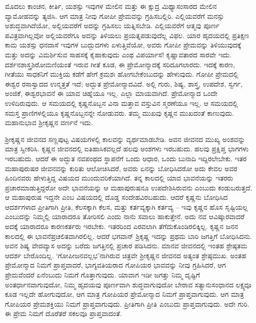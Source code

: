 ಮೊದಲು ಕಾಂಚನ, ಕೀರ್ತಿ, ಯಶಸ್ಸು ಇವುಗಳ ಮೇಲಿನ ಮತ್ತು ಈ ಕ್ಷುದ್ರ ಮಿಥ್ಯಾಸಂಸಾರದ ಮೇಲಿನ ವ್ಯಾಮೋಹವನ್ನು ತ್ಯಜಿಸಿ. ಆಗ ಮಾತ್ರ ನೀವು ಗೋಪೀ ಪ್ರೇಮವನ್ನು ಗ್ರಹಿಸಬಲ್ಲಿರಿ. ಎಲ್ಲಿಯವರೆಗೆ ಮನಸ್ಸು ಅಶುದ್ಧವಾಗಿದೆಯೋ, ಅಲ್ಲಿಯವರೆಗೆ ಅದನ್ನು ಗ್ರಹಿಸಲು ಯತ್ನಿಸಬೇಡಿ. ಎಲ್ಲಿಯವರೆಗೆ ಆತ್ಮವು ಪೂರ್ಣ ಪವಿತ್ರವಾಗಿಲ್ಲವೋ ಅಲ್ಲಿಯವರೆಗೂ ಅದನ್ನು ತಿಳಿಯಲು ಪ್ರಯತ್ನಪಡುವುದೆಲ್ಲ ವಿಫಲ. ಯಾರ ಹೃದಯದಲ್ಲಿ ಪ್ರತಿಕ್ಷಣ ಕಾಮ ಯಶಸ್ಸು ಧನದಾಸೆ ಇವುಗಳ ಬುದ್ಬುದಗಳು ಏಳುತ್ತಿವೆಯೋ, ಅವರು ಗೋಪೀ ಪ್ರೇಮವನ್ನು ತಿಳಿಯುವುದಕ್ಕೆ ಮತ್ತು ಅದನ್ನು ವಿಮರ್ಶಿಸುವ ಸಾಹಸಕ್ಕೆ ಕೈಹಾಕುವುದು ಎಂಥ ವಿಪರ್ಯಾಸ! ಕೃಷ್ಣಾವತಾರದ ಸಾರವೇ ಇದು. ದರ್ಶನಶಾಸ್ತ್ರಶಿರೋಮಣಿಯಂತೆ ಇರುವ ಗೀತೆ ಕೂಡ, ಈ ಪ್ರೇಮೋನ್ಮಾದಕ್ಕೆ ಸರಿದೂಗಲಾರದು. ಇದಕ್ಕೆ ಕಾರಣ, ಗೀತೆಯು ಸಾಧಕನಿಗೆ ಮುಕ್ತಿಯ ಕಡೆಗೆ ಹೇಗೆ ಕ್ರಮಶಃ ಹೋಗಬೇಕೆಂಬುದನ್ನು ಹೇಳುವುದು. ಗೋಪೀ ಪ್ರೇಮದಲ್ಲಿ ಈಶ್ವರ ರಸಾಸ್ವಾದದ ಉನ್ಮತ್ತತೆ ಇದೆ; ಅದ್ಭುತ ಪ್ರೇಮೋನ್ಮಾದವಿದೆ. ಅಲ್ಲಿ ಗುರು, ಶಿಷ್ಯ, ಶಾಸ್ತ್ರ, ಉಪದೇಶ, ಸ್ವರ್ಗ, ಅಂಜಿಕೆ, ಈಶ್ವರಭಾವನೆ ಈ ಯಾವ ಚಿಹ್ನೆಯೂ ಇಲ್ಲ. ಎಲ್ಲಾ ಮಾಯವಾಗಿದೆ. ಪ್ರೇಮೋನ್ಮಾದ ಒಂದೇ ಉಳಿದಿರುವುದು. ಆ ಸಮಯದಲ್ಲಿ ಕೃಷ್ಣನೊಬ್ಬನ ವಿನಾ ಮತ್ತಾವ ವಸ್ತುವಿನ ಸ್ಮರಣೆಯೂ ಇಲ್ಲ. ಆ ಸಮಯದಲ್ಲಿ ಸಮಸ್ತ ಪ್ರಾಣಿಗಳಲ್ಲಿಯೂ ಕೃಷ್ಣನೊಬ್ಬನನ್ನೇ ನೋಡುವರು. ತಮ್ಮ ಮುಖವು ಕೃಷ್ಣನ ಮುಖದಂತೆ ಕಾಣುವುದು. ಮಹಾನುಭಾವ ಶ‍್ರೀಕೃಷ್ಣನ ವರ್ಣನೆ ಇದು. 

ಶ‍್ರೀಕೃಷ್ಣನ ಜೀವನದ ಸಣ್ಣಪುಟ್ಟ ವಿಷಯಗಳಲ್ಲಿ ಕಾಲವನ್ನು ವ್ಯರ್ಥಮಾಡಬೇಡಿ. ಅವನ ಜೀವನದ ಮುಖ್ಯ ಅಂಶವನ್ನು ಮಾತ್ರ ಸ್ವೀಕರಿಸಿ. ಕೃಷ್ಣನ ಜೀವನದಲ್ಲಿ ಐತಿಹಾಸಿಕವಲ್ಲದೆ ಹಲವು ಅಂಶಗಳು ಇರಬಹುದು. ಹಲವು ಪ್ರಕ್ಷಿಪ್ತ ಭಾಗಗಳು ಇರಬಹುದು. ಆದರೆ ಈ ಅದ್ಭುತ ನವಪಂಥದ ಸ್ಥಾಪನೆಗೆ ಒಂದು ಆಧಾರ, ಒಂದು ಬುನಾದಿ ಇದ್ದಿರಲೇಬೇಕು. ಇತರ ಮಹಾಪುರುಷರ ಜೀವನವನ್ನು ಕುರಿತು ಆಲೋಚಿಸಿದರೆ, ಅವರು ಏನನ್ನು ಬೋಧಿಸಿದರೋ ಅದು ಕೇವಲ ಅವರ ಹಿಂದಿನವರು ಹೇಳುತ್ತಿದ್ದ ವಿಷಯದ ಮುಂದುವರಿಕೆಯಾಗಿದೆ. ತನ್ನ ಕಾಲದಲ್ಲಿ ಯಾವ ಭಾವನೆಯನ್ನು ಇತರರು ಪ್ರಚಾರಮಾಡುತ್ತಿದ್ದರೋ ಅದೇ ಭಾವನೆಯನ್ನು ಆ ಮಹಾಪುರುಷನೂ ಉಪದೇಶಿಸಿರುವನು ಎಂಬುದು ಕಂಡುಬರುತ್ತದೆ. ಆ ಮಹಾಪುರುಷ ಇದ್ದನೇ ಎಂಬ ವಿಷಯದಲ್ಲಿ ದೊಡ್ಡ ಸಂದೇಹವಿರಬಹುದು. ಆದರೆ ಕೃಷ್ಣನು ಬೋಧಿಸಿದ ಆದರ್ಶಗಳಾದ ಪ್ರೀತಿಗಾಗಿ ಪ್ರೀತಿ, ಕೆಲಸಕ್ಕಾಗಿ ಕೆಲಸ, ಮತ್ತು ಕರ್ತವ್ಯಕ್ಕಾಗಿ ಕರ್ತವ್ಯ – ಇವು ಕೃಷ್ಣನ ಹೊಸ ಸೃಷ್ಟಿಯಲ್ಲ ಎಂಬುದನ್ನು ನಿಮ್ಮಲ್ಲಿ ಯಾರಾದರೂ ತೋರಿಸಲಿ ಎಂದು ನಾನು ಸವಾಲು ಹಾಕುತ್ತೇನೆ. ಅದು ನವ ಆವಿಷ್ಕಾರವಾದರೆ ಅದಕ್ಕೆ ಯಾರಾದರೂ ಕಾರಣಕರ್ತರು ಇರಬೇಕು. ಇತರರಿಂದ ಎರವಲಾಗಿ ತೆಗೆದುಕೊಂಡಿರಲಿಕ್ಕಿಲ್ಲ. ಕೃಷ್ಣನ ಜನನ ಕಾಲದಲ್ಲಿ ಈ ಭಾವನೆಪ್ರಚಲಿತವಾಗಿರಲಿಲ್ಲ. ಆದರೆ ಭಗವಾನ್​ ಶ್ರಿಕೃಷ್ಣ ಇದನ್ನು ಪ್ರಥಮ ಬಾರಿ ಜಗತ್ತಿಗೆ ಬೋಧಿಸಿದನು. ಅವನ ಶಿಷ್ಯ ವೇದವ್ಯಾಸ ಅದನ್ನು ಬರೆದು ಜಗತ್ತಿನಲ್ಲಿ ಪ್ರಚಾರ ಪಡಿಸಿದನು. ಮಾನವ ಜೀವನದಲ್ಲಿ ಇಂತಹ ಶ್ರೇಷ್ಠತಮ ಆದರ್ಶ ಬೇರೊಂದಿಲ್ಲ. ‘ಗೋಪೀಜನವಲ್ಲಭ’ನಾಗಿರುವ ಚಿತ್ರವೇ ಶ‍್ರೀಕೃಷ್ಣನ ಜೀವನದ ಅತ್ಯಂತ ಶ್ರೇಷ್ಠಮುಖ. ಅಂತಹ ಪ್ರೇಮೋನ್ಮಾದ ನಿಮಗೆ ಪ್ರಾಪ್ತವಾದರೆ, ಭಾಗ್ಯವತಿಯರಾದ ಗೋಪಿಯರ ಭಾವವನ್ನು ನೀವು ಗ್ರಹಿಸಿದರೆ, ಆಗ ಪ್ರೇಮವೆಂದರೆ ಏನೆಂಬುದು ನಿಮಗೆ ಗೊತ್ತಾಗುವುದು. ಯಾವಾಗ ಇಡೀ ಜಗತ್ತು ನಿಮ್ಮ ದೃಷ್ಟಿಗೆ ಅಂತರ್ಧಾನವಾಗುವುದೋ, ನಿಮ್ಮ ಹೃದಯವು ಪೂರ್ಣವಾಗಿ ಶುದ್ಧವಾಗುವುದೋ ಬೇರಾವ ಸತ್ಯಾನುಸಂಧಾನದ ಲಕ್ಷ್ಯವೂ ಕೂಡ ಇಲ್ಲದೇ ಹೋಗುವುದೋ, ಆಗ ಮಾತ್ರ ಗೋಪಿಯರ ಪ್ರೇಮೋನ್ಮಾದ ನಿಮಗೆ ಪ್ರಾಪ್ತವಾಗುವುದು. ಆಗ ಮಾತ್ರ ಗೋಪಿಯರ ಪ್ರೇಮಶಕ್ತಿಯು ನಿಮಗೆ ಪ್ರಾಪ್ತವಾಗುವುದು. ಪ್ರೀತಿಗಾಗಿ ಪ್ರೀತಿ ಎಂಬುದು ಪ್ರಾಪ್ತವಾಗುವುದು. ಅದೇ ಗುರಿ. ಈ ಪ್ರೇಮ ನಿಮಗೆ ದೊರೆತರೆ ಸಕಲವೂ ಪ್ರಾಪ್ತವಾದಂತೆ. 

